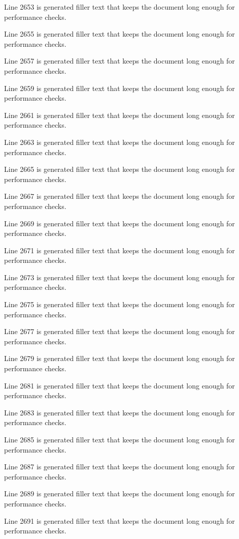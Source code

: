 Line 2653 is generated filler text that keeps the document long enough for performance checks.

Line 2655 is generated filler text that keeps the document long enough for performance checks.

Line 2657 is generated filler text that keeps the document long enough for performance checks.

Line 2659 is generated filler text that keeps the document long enough for performance checks.

Line 2661 is generated filler text that keeps the document long enough for performance checks.

Line 2663 is generated filler text that keeps the document long enough for performance checks.

Line 2665 is generated filler text that keeps the document long enough for performance checks.

Line 2667 is generated filler text that keeps the document long enough for performance checks.

Line 2669 is generated filler text that keeps the document long enough for performance checks.

Line 2671 is generated filler text that keeps the document long enough for performance checks.

Line 2673 is generated filler text that keeps the document long enough for performance checks.

Line 2675 is generated filler text that keeps the document long enough for performance checks.

Line 2677 is generated filler text that keeps the document long enough for performance checks.

Line 2679 is generated filler text that keeps the document long enough for performance checks.

Line 2681 is generated filler text that keeps the document long enough for performance checks.

Line 2683 is generated filler text that keeps the document long enough for performance checks.

Line 2685 is generated filler text that keeps the document long enough for performance checks.

Line 2687 is generated filler text that keeps the document long enough for performance checks.

Line 2689 is generated filler text that keeps the document long enough for performance checks.

Line 2691 is generated filler text that keeps the document long enough for performance checks.

